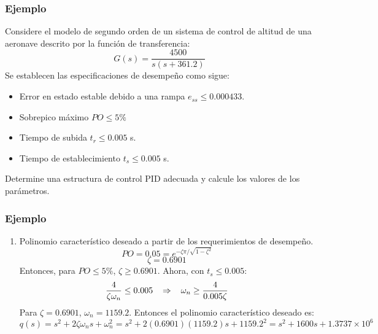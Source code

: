 \documentclass[aspectratio=169,handout]{beamer}
\theoremstyle{definition}
\theoremstyle{plain}
\theoremstyle{remark}
\newcounter{saveenumi}
\newcommand{\seti}{\setcounter{saveenumi}{\value{enumi}}}
\begin{document}
\begin{frame}[c]\frametitle{Ejemplo}
Considere el modelo de segundo orden de un sistema de control de altitud de una aeronave descrito por la función de transferencia:
\begin{equation*}
	G(s) = \frac{4500}{s(s+361.2)}
\end{equation*}
Se establecen las especificaciones de desempeño como sigue:
\begin{itemize}
	\item Error en estado estable debido a una rampa $e_{ss} \leq 0.000433$.
	\item Sobrepico máximo $PO \leq 5\%$
	\item Tiempo de subida $t_r \leq 0.005$ s.
	\item Tiempo de establecimiento $t_s \leq 0.005$ s.
\end{itemize}
Determine una estructura de control PID adecuada y calcule los valores de los parámetros.
\end{frame}

\begin{frame}[<+->]\frametitle{Ejemplo}
\begin{enumerate}
	\item Polinomio característico deseado a partir de los requerimientos de desempeño.
	\begin{equation*}
		PO = 0.05 = e^{-\zeta \pi / \sqrt{1-\zeta^2}}
	\end{equation*}
	\begin{equation*}
		\zeta = 0.6901
	\end{equation*}
	Entonces, para $PO \leq 5\%$, $\zeta \geq 0.6901$. Ahora, con $t_s \leq 0.005$:
	\begin{equation*}
		\frac{4}{\zeta \omega_n} \leq 0.005 \hspace*{3mm} \Rightarrow \hspace*{3mm} \omega_n \geq \frac{4}{0.005\zeta}
	\end{equation*}
	Para $\zeta = 0.6901$, $\omega_n = 1159.2$. Entonces el polinomio característico deseado es:
	\begin{equation*}
		q(s) = s^2 + 2 \zeta \omega_n s + \omega_n^2 = s^2 + 2(0.6901)(1159.2)s + 1159.2^2 = s^2 + 1600s +1.3737\times 10^6
	\end{equation*}
	\seti
\end{enumerate}
\end{frame}
\end{document}
